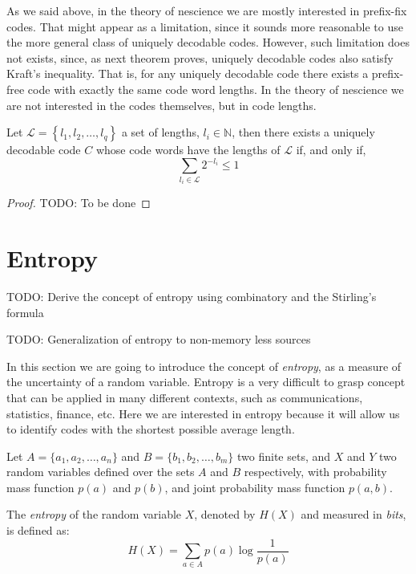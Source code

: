 As we said above, in the theory of nescience we are mostly interested in prefix-fix codes. That might appear as a limitation, since it sounds more reasonable to use the more general class of uniquely decodable codes. However, such limitation does not exists, since, as next theorem proves, uniquely decodable codes also satisfy Kraft's inequality. That is, for any uniquely decodable code there exists a prefix-free code with exactly the same code word lengths. In the theory of nescience we are not interested in the codes themselves, but in code lengths.

\begin{theorem}
\label{th:Kraft-Inequality}
Let $\mathcal{L}=\left\{ l_{1},l_{2},\ldots,l_{q}\right\}$ a set of lengths, $l_{i}\in\mathbb{N}$, then there exists a uniquely decodable code $C$ whose code words have the lengths of $\mathcal{L}$ if, and only if,
\[
\sum_{l_{i}\in\mathcal{L}}2^{-l_{i}} \leq 1
\]
\end{theorem}
\begin{proof}
{\color{red} TODO: To be done}
\end{proof}

%
%

\section{Entropy}
\label{sec:Entropy}

{\color{red} TODO: Derive the concept of entropy using combinatory and the Stirling's formula}

{\color{red} TODO: Generalization of entropy to non-memory less sources}

In this section we are going to introduce the concept of \emph{entropy}, as a measure of the uncertainty of a random variable. Entropy is a very difficult to grasp concept that can be applied in many different contexts, such as communications, statistics, finance, etc. Here we are interested in entropy because it will allow us to identify codes with the shortest possible average length.

Let $A = \{a_1, a_2, \ldots, a_n\}$ and $B = \{b_1, b_2, \dots, b_m\}$ two finite sets, and $X$ and $Y$ two random variables defined over the sets $A$ and $B$ respectively, with probability mass function $p(a)$ and $p(b)$, and joint probability mass function $p(a, b)$.

\begin{definition}[Entropy]
The \emph{entropy} of the random variable $X$, denoted by $H(X)$ and measured in \emph{bits}, is defined as:
\[
H(X) = \sum_{a \in A} p(a) \log \frac{1}{p(a)}
\]
\end{definition}

